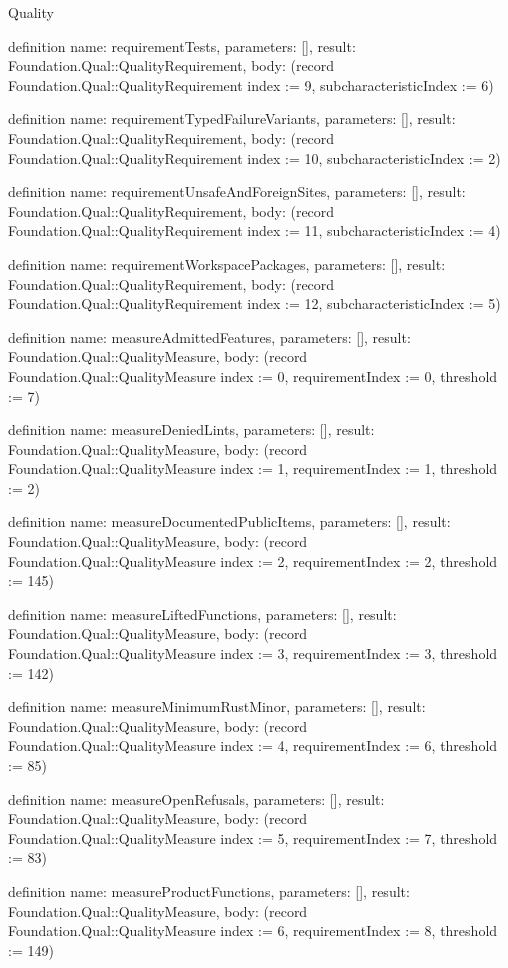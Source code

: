 \begin{lexlean}{Quality}
\begin{semanticmodule}
definition{
  name: requirementTests,
  parameters: [],
  result: Foundation.Qual::QualityRequirement,
  body: (record Foundation.Qual::QualityRequirement {index := 9, subcharacteristicIndex := 6})
}

definition{
  name: requirementTypedFailureVariants,
  parameters: [],
  result: Foundation.Qual::QualityRequirement,
  body: (record Foundation.Qual::QualityRequirement {index := 10, subcharacteristicIndex := 2})
}

definition{
  name: requirementUnsafeAndForeignSites,
  parameters: [],
  result: Foundation.Qual::QualityRequirement,
  body: (record Foundation.Qual::QualityRequirement {index := 11, subcharacteristicIndex := 4})
}

definition{
  name: requirementWorkspacePackages,
  parameters: [],
  result: Foundation.Qual::QualityRequirement,
  body: (record Foundation.Qual::QualityRequirement {index := 12, subcharacteristicIndex := 5})
}

definition{
  name: measureAdmittedFeatures,
  parameters: [],
  result: Foundation.Qual::QualityMeasure,
  body: (record Foundation.Qual::QualityMeasure {index := 0, requirementIndex := 0, threshold := 7})
}

definition{
  name: measureDeniedLints,
  parameters: [],
  result: Foundation.Qual::QualityMeasure,
  body: (record Foundation.Qual::QualityMeasure {index := 1, requirementIndex := 1, threshold := 2})
}

definition{
  name: measureDocumentedPublicItems,
  parameters: [],
  result: Foundation.Qual::QualityMeasure,
  body: (record Foundation.Qual::QualityMeasure {index := 2, requirementIndex := 2, threshold := 145})
}

definition{
  name: measureLiftedFunctions,
  parameters: [],
  result: Foundation.Qual::QualityMeasure,
  body: (record Foundation.Qual::QualityMeasure {index := 3, requirementIndex := 3, threshold := 142})
}

definition{
  name: measureMinimumRustMinor,
  parameters: [],
  result: Foundation.Qual::QualityMeasure,
  body: (record Foundation.Qual::QualityMeasure {index := 4, requirementIndex := 6, threshold := 85})
}

definition{
  name: measureOpenRefusals,
  parameters: [],
  result: Foundation.Qual::QualityMeasure,
  body: (record Foundation.Qual::QualityMeasure {index := 5, requirementIndex := 7, threshold := 83})
}

definition{
  name: measureProductFunctions,
  parameters: [],
  result: Foundation.Qual::QualityMeasure,
  body: (record Foundation.Qual::QualityMeasure {index := 6, requirementIndex := 8, threshold := 149})
}


\end{semanticmodule}
\end{lexlean}
